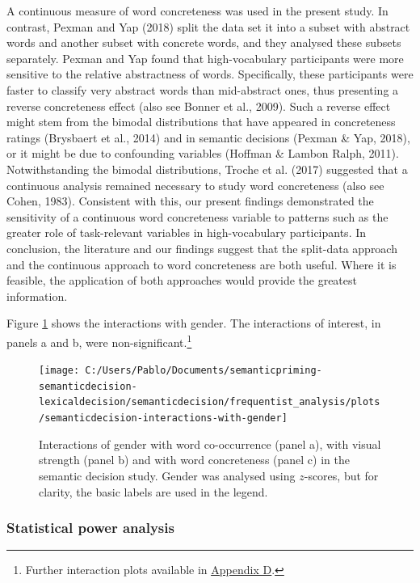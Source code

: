 \documentclass[
  12pt,
  man,floatsintext]{apa7}
\begin{document}
A continuous measure of word concreteness was used in the present study. In contrast, Pexman and Yap (2018) split the data set it into a subset with abstract words and another subset with concrete words, and they analysed these subsets separately. Pexman and Yap found that high-vocabulary participants were more sensitive to the relative abstractness of words. Specifically, these participants were faster to classify very abstract words than mid-abstract ones, thus presenting a reverse concreteness effect (also see Bonner et al., 2009). Such a reverse effect might stem from the bimodal distributions that have appeared in concreteness ratings (Brysbaert et al., 2014) and in semantic decisions (Pexman \& Yap, 2018), or it might be due to confounding variables (Hoffman \& Lambon Ralph, 2011). Notwithstanding the bimodal distributions, Troche et al. (2017) suggested that a continuous analysis remained necessary to study word concreteness (also see Cohen, 1983). Consistent with this, our present findings demonstrated the sensitivity of a continuous word concreteness variable to patterns such as the greater role of task-relevant variables in high-vocabulary participants. In conclusion, the literature and our findings suggest that the split-data approach and the continuous approach to word concreteness are both useful. Where it is feasible, the application of both approaches would provide the greatest information.

Figure \ref{fig:semanticdecision-interactions-with-gender} shows the interactions with gender. The interactions of interest, in panels a and b, were non-significant.\footnote{Further interaction plots available in \protect\hyperlink{appendix-D-interaction-plots}{\underline{Appendix D}}.}

\begin{figure}

{\centering \texttt{[image: C:/Users/Pablo/Documents/semanticpriming-semanticdecision-lexicaldecision/semanticdecision/frequentist\_analysis/plots/semanticdecision-interactions-with-gender]} 

}

\caption{Interactions of gender with word co-occurrence (panel a), with visual strength (panel b) and with word concreteness (panel c) in the semantic decision study. Gender was analysed using $z$-scores, but for clarity, the basic labels are used in the legend.}\label{fig:semanticdecision-interactions-with-gender}
\end{figure}

\hypertarget{statistical-power-analysis-4}{%
\subsubsection{Statistical power analysis}\label{statistical-power-analysis-4}}
\end{document}
